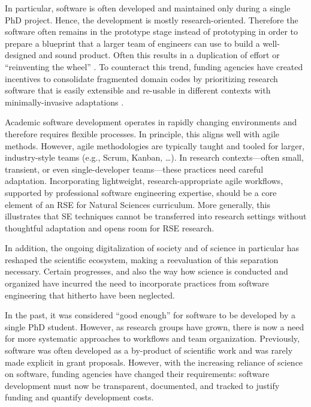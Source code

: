 \documentclass[
        twocolumn,german,biblatex
    ]{article}
\begin{document}
    In particular, software is often developed and maintained only
    during a single PhD project. Hence, the development is mostly
    research-oriented. Therefore the software often remains in the
    prototype stage instead of prototyping in order to prepare a
    blueprint that a larger team of engineers can use to build a
    well-designed and sound product. Often this results in a duplication
    of effort or ``reinventing the wheel'' \autocite{Smith2024}. To
    counteract this trend, funding agencies have created incentives to
    consolidate fragmented domain codes by prioritizing research
    software that is easily extensible and re-usable in different
    contexts with minimally-invasive adaptations \autocite{DFG2022RSE}.

    Academic software development operates in rapidly changing
    environments and therefore requires flexible processes. In
    principle, this aligns well with agile methods. However, agile
    methodologies are typically taught and tooled for larger,
    industry-style teams (e.g., Scrum, Kanban, \ldots). In research
    contexts---often small, transient, or even single-developer
    teams---these practices need careful adaptation. Incorporating
    lightweight, research-appropriate agile workflows, supported by
    professional software engineering expertise, should be a core
    element of an RSE for Natural Sciences curriculum. More generally,
    this illustrates that SE techniques cannot be transferred into
    research settings without thoughtful adaptation and opens room for
    RSE research.

    In addition, the ongoing digitalization of society and of science in
    particular has reshaped the scientific ecosystem, making a
    reevaluation of this separation necessary. Certain progresses, and
    also the way how science is conducted and organized have incurred
    the need to incorporate practices from software engineering that
    hitherto have been neglected.

    In the past, it was considered ``good enough'' for software to be
    developed by a single PhD student. However, as research groups have
    grown, there is now a need for more systematic approaches to
    workflows and team organization. Previously, software was often
    developed as a by-product of scientific work and was rarely made
    explicit in grant proposals. However, with the increasing reliance
    of science on software, funding agencies have changed their
    requirements: software development must now be transparent,
    documented, and tracked to justify funding and quantify development
    costs.
\end{document}
